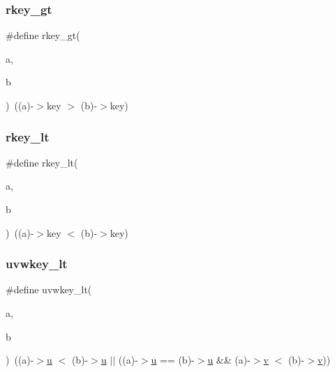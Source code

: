 \mbox{\label{a00206_a9d453b11fd5d7d10eee018e8a65e68a8}} 
\subsubsection{\texorpdfstring{rkey\+\_\+gt}{rkey\_gt}}
{\footnotesize\ttfamily \#define rkey\+\_\+gt(\begin{DoxyParamCaption}\item[{}]{a,  }\item[{}]{b }\end{DoxyParamCaption})~((a)-\/$>$key $>$ (b)-\/$>$key)}

\mbox{\label{a00206_a3ba1de233f80a359f3ee192171e838f5}} 
\subsubsection{\texorpdfstring{rkey\+\_\+lt}{rkey\_lt}}
{\footnotesize\ttfamily \#define rkey\+\_\+lt(\begin{DoxyParamCaption}\item[{}]{a,  }\item[{}]{b }\end{DoxyParamCaption})~((a)-\/$>$key $<$ (b)-\/$>$key)}

\mbox{\label{a00206_a426924f08f3b3d6f3aeac24639e56986}} 
\subsubsection{\texorpdfstring{uvwkey\+\_\+lt}{uvwkey\_lt}}
{\footnotesize\ttfamily \#define uvwkey\+\_\+lt(\begin{DoxyParamCaption}\item[{}]{a,  }\item[{}]{b }\end{DoxyParamCaption})~((a)-\/$>$\hyperlink{a00605_a6277e2a7446059985dc9bcf0a4ac1a8f}{u} $<$ (b)-\/$>$\hyperlink{a00605_a6277e2a7446059985dc9bcf0a4ac1a8f}{u} $\vert$$\vert$ ((a)-\/$>$\hyperlink{a00605_a6277e2a7446059985dc9bcf0a4ac1a8f}{u} == (b)-\/$>$\hyperlink{a00605_a6277e2a7446059985dc9bcf0a4ac1a8f}{u} \&\& (a)-\/$>$\hyperlink{a00605_ac4055e3a20b6b3af3d10590ea446ef6c}{v} $<$ (b)-\/$>$\hyperlink{a00605_ac4055e3a20b6b3af3d10590ea446ef6c}{v}))}



